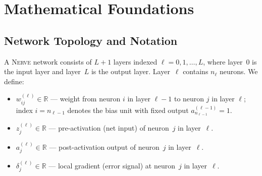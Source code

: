 \documentclass[11pt,a4paper]{article}
\newcommand{\nerve}{\textsc{Nerve}}
\newcommand{\R}{\mathbb{R}}
\begin{document}
\section{Mathematical Foundations}
\label{sec:math}

\subsection{Network Topology and Notation}

A \nerve{} network consists of $L+1$ layers indexed $\ell=0,1,\ldots,L$, where
layer~0 is the input layer and layer~$L$ is the output layer. Layer~$\ell$
contains $n_\ell$ neurons. We define:

\begin{itemize}[leftmargin=2.4em]
  \item $w_{ij}^{(\ell)} \in \R$ --- weight from neuron $i$ in layer $\ell-1$
        to neuron $j$ in layer $\ell$; index $i = n_{\ell-1}$ denotes
        the bias unit with fixed output $a_{n_{\ell-1}}^{(\ell-1)} = 1$.
  \item $z_j^{(\ell)} \in \R$ --- pre-activation (net input) of neuron~$j$
        in layer~$\ell$.
  \item $a_j^{(\ell)} \in \R$ --- post-activation output of neuron~$j$
        in layer~$\ell$.
  \item $\delta_j^{(\ell)} \in \R$ --- local gradient (error signal) at
        neuron~$j$ in layer~$\ell$.
\end{itemize}
\end{document}
